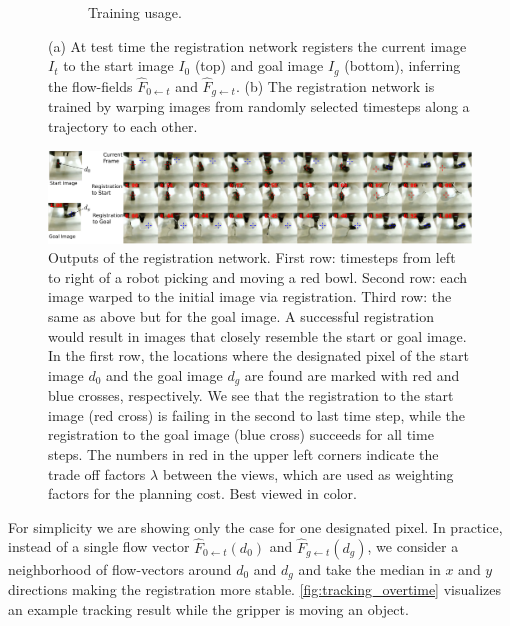 \begin{figure}[t!]
\begin{subfigure}[b]{0.55\textwidth}
        \caption{\small{Training usage.}}
        \label{fig:discrete}
    \end{subfigure}
    \vspace{-1mm}
    \caption{\small{(a) At test time the registration network registers the current image $I_t$ to the start image $I_0$ (top) and goal image $I_g$ (bottom), inferring the flow-fields $\hat{F}_{0 \leftarrow t}$ and $\hat{F}_{g \leftarrow t}$. (b) The registration network is trained by warping images from randomly selected timesteps along a trajectory to each other.
    }}
    \label{fig:registration_arch}
\end{figure}

\begin{figure}
    \centering
    \vspace{-0.05in}
    \includegraphics[width=1\textwidth]{images/registration_overtime.pdf}
    \vspace{-0.2in}
    \caption{\small{Outputs of the registration network. First row: timesteps from left to right of a robot picking and moving a red bowl. Second row: each image warped to the initial image via registration. Third row: the same as above but for the goal image. A successful registration would result in images that closely resemble the start or goal image. In the first row, the locations where the designated pixel of the start image $d_0$ and the goal image $d_g$ are found are marked with red and blue crosses, respectively. We see that the registration to the start image (red cross) is failing in the second to last time step, while the registration to the goal image (blue cross) succeeds for all time steps. The numbers in red in the upper left corners indicate the trade off factors $\lambda$ between the views, which are used as weighting factors for the planning cost. Best viewed in color.}}
    \label{fig:tracking_overtime}
    \vspace{-0.2in}
\end{figure}

For simplicity we are showing only the case for one designated pixel. In practice, instead of a single flow vector $\hat{F}_{0 \leftarrow t}(d_0)$ and $\hat{F}_{g \leftarrow t}(d_g)$, we consider a neighborhood of flow-vectors around $d_0$ and $d_g$ and take the median in $x$ and $y$ directions making the registration more stable.
\autoref{fig:tracking_overtime} visualizes an example tracking result while the gripper is moving an object.

